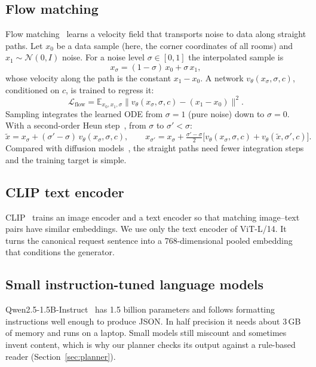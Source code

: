 \documentclass[11pt,a4paper]{article}
\begin{document}
\subsection{Flow matching}
Flow matching~\cite{flowmatching,rectifiedflow} learns a velocity field that
transports noise to data along straight paths. Let $x_0$ be a data sample (here,
the corner coordinates of all rooms) and $x_1\sim\mathcal{N}(0,I)$ noise. For a
noise level $\sigma\in[0,1]$ the interpolated sample is
\begin{equation}
  x_\sigma = (1-\sigma)\,x_0 + \sigma\,x_1 ,
\end{equation}
whose velocity along the path is the constant $x_1 - x_0$. A network
$v_\theta(x_\sigma,\sigma,c)$, conditioned on $c$, is trained to regress it:
\begin{equation}
  \mathcal{L}_{\text{flow}} = \mathbb{E}_{x_0,x_1,\sigma}
  \big\lVert v_\theta(x_\sigma,\sigma,c) - (x_1 - x_0)\big\rVert^2 .
\end{equation}
Sampling integrates the learned ODE from $\sigma=1$ (pure noise) down to
$\sigma=0$. With a second-order Heun step~\cite{edm}, from $\sigma$ to
$\sigma' < \sigma$:
\begin{equation}
  \tilde{x} = x_\sigma + (\sigma'-\sigma)\,v_\theta(x_\sigma,\sigma,c),\qquad
  x_{\sigma'} = x_\sigma + \tfrac{\sigma'-\sigma}{2}\big[v_\theta(x_\sigma,\sigma,c)
  + v_\theta(\tilde{x},\sigma',c)\big].
\end{equation}
Compared with diffusion models~\cite{ddpm}, the straight paths need fewer
integration steps and the training target is simple.

\subsection{CLIP text encoder}
CLIP~\cite{clip} trains an image encoder and a text encoder so that matching
image--text pairs have similar embeddings. We use only the text encoder of
ViT-L/14. It turns the canonical request sentence into a 768-dimensional pooled
embedding that conditions the generator.

\subsection{Small instruction-tuned language models}
Qwen2.5-1.5B-Instruct~\cite{qwen25} has 1.5 billion parameters and follows
formatting instructions well enough to produce JSON. In half precision it needs
about 3\,GB of memory and runs on a laptop. Small models still miscount and
sometimes invent content, which is why our planner checks its output against a
rule-based reader (Section~\ref{sec:planner}).
\end{document}
